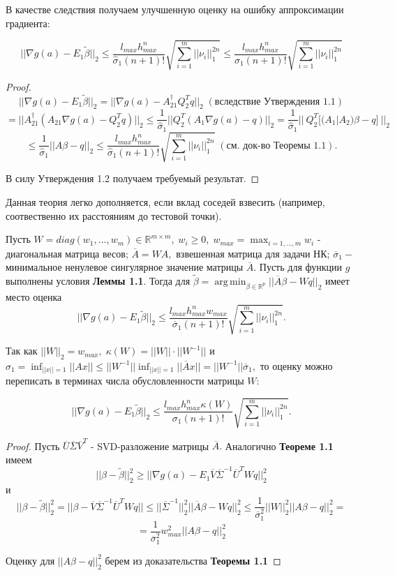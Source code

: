 \documentclass[12 pt, russian]{article}
\DeclareMathOperator*{\argmin}{arg\,min}
\begin{document}
В качестве следствия получаем улучшенную оценку на ошибку аппроксимации градиента:

\begin{Cor}
\[|| \nabla g(a) - E_1\tilde{\beta}||_2 \leq \frac{l_{max}h^n_{max}}{\hat{\sigma}_1(n+1)!}\sqrt{\sum_{i=1}^m||\nu_i||_1^{2n}} \leq \frac{l_{max}h^n_{max}}{\sigma_1(n+1)!}\sqrt{\sum_{i=1}^m||\nu_i||_1^{2n}}\]
\end{Cor}
\begin{proof}
\[|| \nabla g(a) - E_1\tilde{\beta}||_2 = || \nabla g(a) - A_{21}^{\dagger}Q_2^Tq||_2 \;(\text{вследствие Утверждения 1.1})\]
\[
=  || A_{21}^{\dagger}(A_{21}\nabla g(a) - Q_2^Tq)||_2 \leq \frac{1}{\hat{\sigma}_1}|| Q_2^T(A_1\nabla g(a) - q)||_2 = \frac{1}{\hat{\sigma}_1}|| \: Q_2^T[(A_1|A_2)\beta - q]\:||_2
\] 
\[ \leq \frac{1}{\hat{\sigma}_1}||A\beta - q||_2 \leq \frac{l_{max}h^n_{max}}{\hat{\sigma}_1(n+1)!}\sqrt{\sum_{i=1}^m||\nu_i||_1^{2n}} \; (\text{см. док-во Теоремы 1.1}).\]

В силу Утверждения 1.2 получаем требуемый результат.
\end{proof}

Данная теория легко дополняется, если вклад соседей взвесить (например, соотвественно их расстояниям до тестовой точки).

\begin{Rem}
    Пусть $W = diag(w_1, ..., w_m) \in \mathbb{R}^{m \times m}, \; w_i \geq 0, \; w_{max} = \max_{i=1,...,m}w_i$ - диагональная матрица весов; $\overline{A} = WA, $ взвешенная матрица для задачи НК; $ \overline{\sigma}_1 - $ минимальное ненулевое сингулярное значение матрицы $\overline{A}$. Пусть для функции $g$  выполнены условия \textbf{Леммы 1.1}. Тогда для $\tilde{\beta} = \argmin_{\beta \in \mathbb{R}^p}||\overline{A}\beta - Wq||_2$  имеет место оценка
    $$  
    ||\nabla g(a) - E_1\tilde{\beta}||_2 \leq \frac{l_{max} h^n_{max} w_{max}}{\overline{\sigma}_1(n+1)!}\sqrt{\sum_{i=1}^m||\nu_i||_1^{2n}}.
    $$

    Так как $||W||_2 = w_{max}, \; \kappa(W) = ||W||\cdot||W^{-1}||$ и $\sigma_1 = \inf_{||x||=1} ||Ax|| \leq ||W^{-1}||\inf_{||x||=1} ||\overline{A}x|| = ||W^{-1}||\overline{\sigma}_1, $ то оценку можно переписать в терминах числа обусловленности матрицы $W:$

    $$ ||\nabla g(a) - E_1\tilde{\beta}||_2 \leq \frac{l_{max} h^n_{max} \kappa(W)}{\sigma_1(n+1)!}\sqrt{\sum_{i=1}^m||\nu_i||_1^{2n}}. $$
\end{Rem}
\begin{proof}
    Пусть $\overline{U}\overline{\Sigma}\overline{V}^T$ - SVD-разложение матрицы $\overline{A}.$ Аналогично \textbf{Теореме 1.1} имеем 
    \[ ||\beta - \tilde{\beta}||_2^2 \geq ||\nabla g(a) -E_1 \overline{V}\overline{\Sigma}^{-1}\overline{U}^TWq||_2^2 \]
    и 
    \[ 
    ||\beta - \tilde{\beta} ||_2^2 = ||\beta - \overline{V}\overline{\Sigma}^{-1}\overline{U}^TWq|| \leq ||\overline{\Sigma}^{-1}||_2^2||\overline{A}\beta - Wq||_2^2 \leq \frac{1}{\overline{\sigma}_1^2}||W||_2^2||A\beta - q||^2_2 = 
    \]
    \[ = \frac{1}{\overline{\sigma}_1^2}w_{max}^2||A\beta - q||^2_2 \]

     Оценку для $||A\beta - q||^2_2$ берем из доказательства \textbf{Теоремы 1.1}
\end{proof}
\end{document}
